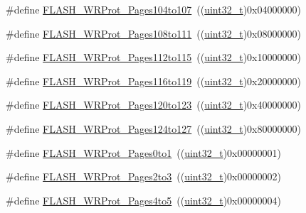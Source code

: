 \begin{DoxyCompactItemize}
\#define \hyperlink{group___option___bytes___write___protection_ga2e096d51e61a972c97093110211b3be5}{F\+L\+A\+S\+H\+\_\+\+W\+R\+Prot\+\_\+\+Pages104to107}~((\hyperlink{_p_e___types_8h_a33594304e786b158f3fb30289278f5af}{uint32\+\_\+t})0x04000000)
\item 
\#define \hyperlink{group___option___bytes___write___protection_ga899e34df1ab5369d840461686eb9c318}{F\+L\+A\+S\+H\+\_\+\+W\+R\+Prot\+\_\+\+Pages108to111}~((\hyperlink{_p_e___types_8h_a33594304e786b158f3fb30289278f5af}{uint32\+\_\+t})0x08000000)
\item 
\#define \hyperlink{group___option___bytes___write___protection_gacd2d5839240b77f70be15e76086745ab}{F\+L\+A\+S\+H\+\_\+\+W\+R\+Prot\+\_\+\+Pages112to115}~((\hyperlink{_p_e___types_8h_a33594304e786b158f3fb30289278f5af}{uint32\+\_\+t})0x10000000)
\item 
\#define \hyperlink{group___option___bytes___write___protection_ga1283655c7c974e0de142cec7921c8673}{F\+L\+A\+S\+H\+\_\+\+W\+R\+Prot\+\_\+\+Pages116to119}~((\hyperlink{_p_e___types_8h_a33594304e786b158f3fb30289278f5af}{uint32\+\_\+t})0x20000000)
\item 
\#define \hyperlink{group___option___bytes___write___protection_gac8d2f42123810fefc68572709d8830ec}{F\+L\+A\+S\+H\+\_\+\+W\+R\+Prot\+\_\+\+Pages120to123}~((\hyperlink{_p_e___types_8h_a33594304e786b158f3fb30289278f5af}{uint32\+\_\+t})0x40000000)
\item 
\#define \hyperlink{group___option___bytes___write___protection_gae6e70db5200b52248c9ec4293ff9890e}{F\+L\+A\+S\+H\+\_\+\+W\+R\+Prot\+\_\+\+Pages124to127}~((\hyperlink{_p_e___types_8h_a33594304e786b158f3fb30289278f5af}{uint32\+\_\+t})0x80000000)
\item 
\#define \hyperlink{group___option___bytes___write___protection_ga7dfbb58b90b63afef11bfcf7a8f109e2}{F\+L\+A\+S\+H\+\_\+\+W\+R\+Prot\+\_\+\+Pages0to1}~((\hyperlink{_p_e___types_8h_a33594304e786b158f3fb30289278f5af}{uint32\+\_\+t})0x00000001)
\item 
\#define \hyperlink{group___option___bytes___write___protection_gaeeb592e66053dde68ebb3ff3926d033d}{F\+L\+A\+S\+H\+\_\+\+W\+R\+Prot\+\_\+\+Pages2to3}~((\hyperlink{_p_e___types_8h_a33594304e786b158f3fb30289278f5af}{uint32\+\_\+t})0x00000002)
\item 
\#define \hyperlink{group___option___bytes___write___protection_ga2835294ea5c096360cc5683b7f90b543}{F\+L\+A\+S\+H\+\_\+\+W\+R\+Prot\+\_\+\+Pages4to5}~((\hyperlink{_p_e___types_8h_a33594304e786b158f3fb30289278f5af}{uint32\+\_\+t})0x00000004)
\item 

\end{DoxyCompactItemize}
